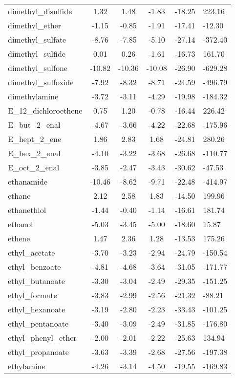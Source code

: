 \documentclass{amsart}
\begin{document}
\begin{longtable}{L|C|C|C|X|X}
dimethyl\_disulfide & 1.32 & 1.48 & -1.83 & -18.25 & 223.16 \\ 
dimethyl\_ether & -1.15 & -0.85 & -1.91 & -17.41 & -12.30 \\ 
dimethyl\_sulfate & -8.76 & -7.85 & -5.10 & -27.14 & -372.40 \\ 
dimethyl\_sulfide & 0.01 & 0.26 & -1.61 & -16.73 & 161.70 \\ 
dimethyl\_sulfone & -10.82 & -10.36 & -10.08 & -26.90 & -629.28 \\ 
dimethyl\_sulfoxide & -7.92 & -8.32 & -8.71 & -24.59 & -496.79 \\ 
dimethylamine & -3.72 & -3.11 & -4.29 & -19.98 & -184.32 \\ 
E\_12\_dichloroethene & 0.75 & 1.20 & -0.78 & -16.44 & 226.42 \\ 
E\_but\_2\_enal & -4.67 & -3.66 & -4.22 & -22.68 & -175.96 \\ 
E\_hept\_2\_ene & 1.86 & 2.83 & 1.68 & -24.81 & 280.26 \\ 
E\_hex\_2\_enal & -4.10 & -3.22 & -3.68 & -26.68 & -110.77 \\ 
E\_oct\_2\_enal & -3.85 & -2.47 & -3.43 & -30.62 & -47.53 \\ 
ethanamide & -10.46 & -8.62 & -9.71 & -22.48 & -414.97 \\ 
ethane & 2.12 & 2.58 & 1.83 & -14.50 & 199.96 \\ 
ethanethiol & -1.44 & -0.40 & -1.14 & -16.61 & 181.74 \\ 
ethanol & -5.03 & -3.45 & -5.00 & -18.60 & 15.87 \\ 
ethene & 1.47 & 2.36 & 1.28 & -13.53 & 175.26 \\ 
ethyl\_acetate & -3.70 & -3.23 & -2.94 & -24.79 & -150.54 \\ 
ethyl\_benzoate & -4.81 & -4.68 & -3.64 & -31.05 & -171.77 \\ 
ethyl\_butanoate & -3.30 & -3.04 & -2.49 & -29.35 & -151.25 \\ 
ethyl\_formate & -3.83 & -2.99 & -2.56 & -21.32 & -88.21 \\ 
ethyl\_hexanoate & -3.19 & -2.80 & -2.23 & -33.43 & -101.25 \\ 
ethyl\_pentanoate & -3.40 & -3.09 & -2.49 & -31.85 & -176.80 \\ 
ethyl\_phenyl\_ether & -2.00 & -2.01 & -2.22 & -25.63 & 134.94 \\ 
ethyl\_propanoate & -3.63 & -3.39 & -2.68 & -27.56 & -197.38 \\ 
ethylamine & -4.26 & -3.14 & -4.50 & -19.55 & -169.83 \\ 

\end{longtable}
\end{document}
